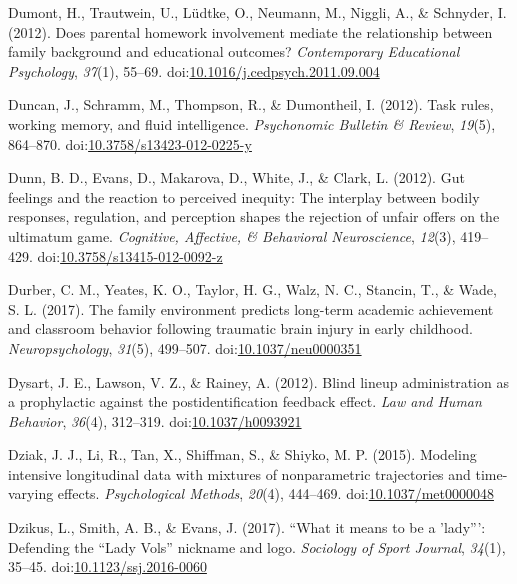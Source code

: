 \documentclass[english,man]{apa6}
\theoremstyle{definition}
\theoremstyle{definition}
\theoremstyle{definition}
\theoremstyle{remark}
\begin{document}
\hypertarget{ref-Dumont2012}{}
Dumont, H., Trautwein, U., Lüdtke, O., Neumann, M., Niggli, A., \&
Schnyder, I. (2012). Does parental homework involvement mediate the
relationship between family background and educational outcomes?
\emph{Contemporary Educational Psychology}, \emph{37}(1), 55--69.
doi:\href{https://doi.org/10.1016/j.cedpsych.2011.09.004}{10.1016/j.cedpsych.2011.09.004}

\hypertarget{ref-Duncan2012}{}
Duncan, J., Schramm, M., Thompson, R., \& Dumontheil, I. (2012). Task
rules, working memory, and fluid intelligence. \emph{Psychonomic
Bulletin \& Review}, \emph{19}(5), 864--870.
doi:\href{https://doi.org/10.3758/s13423-012-0225-y}{10.3758/s13423-012-0225-y}

\hypertarget{ref-Dunn2012}{}
Dunn, B. D., Evans, D., Makarova, D., White, J., \& Clark, L. (2012).
Gut feelings and the reaction to perceived inequity: The interplay
between bodily responses, regulation, and perception shapes the
rejection of unfair offers on the ultimatum game. \emph{Cognitive,
Affective, \& Behavioral Neuroscience}, \emph{12}(3), 419--429.
doi:\href{https://doi.org/10.3758/s13415-012-0092-z}{10.3758/s13415-012-0092-z}

\hypertarget{ref-Durber2017}{}
Durber, C. M., Yeates, K. O., Taylor, H. G., Walz, N. C., Stancin, T.,
\& Wade, S. L. (2017). The family environment predicts long-term
academic achievement and classroom behavior following traumatic brain
injury in early childhood. \emph{Neuropsychology}, \emph{31}(5),
499--507.
doi:\href{https://doi.org/10.1037/neu0000351}{10.1037/neu0000351}

\hypertarget{ref-Dysart2012}{}
Dysart, J. E., Lawson, V. Z., \& Rainey, A. (2012). Blind lineup
administration as a prophylactic against the postidentification feedback
effect. \emph{Law and Human Behavior}, \emph{36}(4), 312--319.
doi:\href{https://doi.org/10.1037/h0093921}{10.1037/h0093921}

\hypertarget{ref-Dziak2015}{}
Dziak, J. J., Li, R., Tan, X., Shiffman, S., \& Shiyko, M. P. (2015).
Modeling intensive longitudinal data with mixtures of nonparametric
trajectories and time-varying effects. \emph{Psychological Methods},
\emph{20}(4), 444--469.
doi:\href{https://doi.org/10.1037/met0000048}{10.1037/met0000048}

\hypertarget{ref-Dzikus2017}{}
Dzikus, L., Smith, A. B., \& Evans, J. (2017). ``What it means to be a
'lady''': Defending the ``Lady Vols'' nickname and logo. \emph{Sociology
of Sport Journal}, \emph{34}(1), 35--45.
doi:\href{https://doi.org/10.1123/ssj.2016-0060}{10.1123/ssj.2016-0060}
\end{document}
